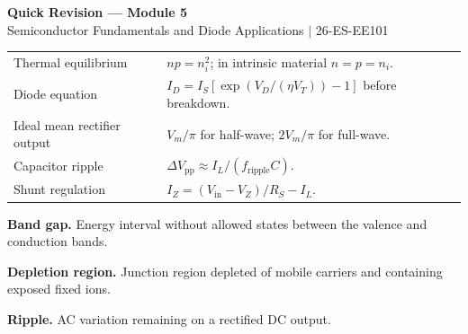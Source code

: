 \documentclass[12pt,a4paper]{article}
\renewcommand{\arraystretch}{1.45}
\begin{document}
\newpage
\begin{center}
  {\large\bfseries\color{myred} Quick Revision --- Module 5}\\[3pt]
  {\small\color{mydark} Semiconductor Fundamentals and Diode Applications $|$ 26-ES-EE101}
\end{center}
\noindent{\color{myred}\rule{\linewidth}{1.2pt}}
\vspace{4pt}

\begin{tcolorbox}[formulabox, title={Key Formulas and Concepts at a Glance}]
\renewcommand{\arraystretch}{1.35}
\begin{tabularx}{\linewidth}{B{4.4cm}Y}
Thermal equilibrium & $np=n_i^2$; in intrinsic material $n=p=n_i$. \\[3pt]
Diode equation & $I_D=I_S[\exp(V_D/(\eta V_T))-1]$ before breakdown. \\[3pt]
Ideal mean rectifier output & $V_m/\pi$ for half-wave; $2V_m/\pi$ for full-wave. \\[3pt]
Capacitor ripple & $\Delta V_{\mathrm{pp}}\approx I_L/(f_{\mathrm{ripple}}C)$. \\[3pt]
Shunt regulation & $I_Z=(V_{\mathrm{in}}-V_Z)/R_S-I_L$. \\[3pt]
\end{tabularx}
\end{tcolorbox}

\begin{tcolorbox}[defbox, title={One-Line Definitions}]
\textbf{Band gap.} Energy interval without allowed states between the valence and conduction bands.

\textbf{Depletion region.} Junction region depleted of mobile carriers and containing exposed fixed ions.

\textbf{Ripple.} AC variation remaining on a rectified DC output.
\end{tcolorbox}
\end{document}
